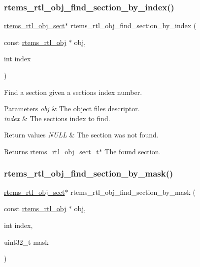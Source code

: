 \subsubsection{\texorpdfstring{rtems\_rtl\_obj\_find\_section\_by\_index()}{rtems\_rtl\_obj\_find\_section\_by\_index()}}
{\footnotesize\ttfamily \mbox{\hyperlink{structrtems__rtl__obj__sect}{rtems\+\_\+rtl\+\_\+obj\+\_\+sect}}$\ast$ rtems\+\_\+rtl\+\_\+obj\+\_\+find\+\_\+section\+\_\+by\+\_\+index (\begin{DoxyParamCaption}\item[{const \mbox{\hyperlink{structrtems__rtl__obj}{rtems\+\_\+rtl\+\_\+obj}} $\ast$}]{obj,  }\item[{int}]{index }\end{DoxyParamCaption})}

Find a section given a section\textquotesingle{}s index number.


\begin{DoxyParams}{Parameters}
{\em obj} & The object file\textquotesingle{}s descriptor. \\
\hline
{\em index} & The section\textquotesingle{}s index to find. \\
\hline
\end{DoxyParams}

\begin{DoxyRetVals}{Return values}
{\em N\+U\+LL} & The section was not found. \\
\hline
\end{DoxyRetVals}
\begin{DoxyReturn}{Returns}
rtems\+\_\+rtl\+\_\+obj\+\_\+sect\+\_\+t$\ast$ The found section. 
\end{DoxyReturn}
\mbox{\label{rtl-obj_8c_a99bc60fea183744d2e3553f517bc6d22}} 
\subsubsection{\texorpdfstring{rtems\_rtl\_obj\_find\_section\_by\_mask()}{rtems\_rtl\_obj\_find\_section\_by\_mask()}}
{\footnotesize\ttfamily \mbox{\hyperlink{structrtems__rtl__obj__sect}{rtems\+\_\+rtl\+\_\+obj\+\_\+sect}}$\ast$ rtems\+\_\+rtl\+\_\+obj\+\_\+find\+\_\+section\+\_\+by\+\_\+mask (\begin{DoxyParamCaption}\item[{const \mbox{\hyperlink{structrtems__rtl__obj}{rtems\+\_\+rtl\+\_\+obj}} $\ast$}]{obj,  }\item[{int}]{index,  }\item[{uint32\+\_\+t}]{mask }\end{DoxyParamCaption})}

